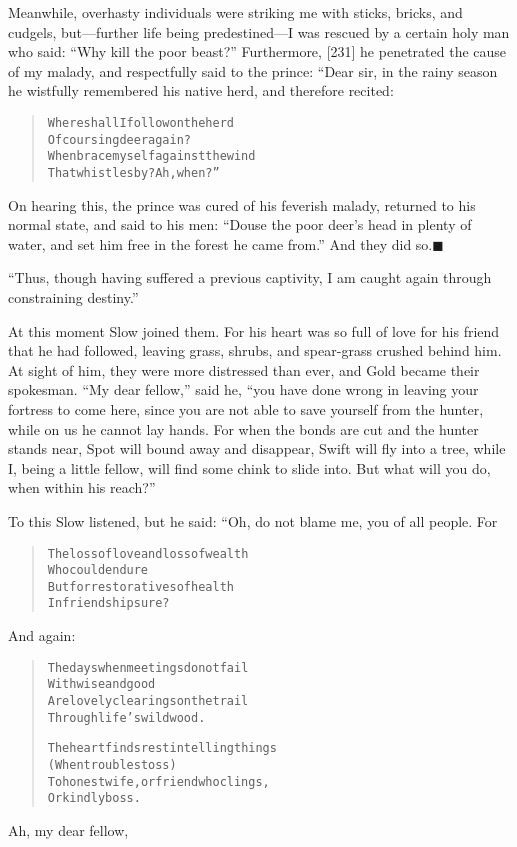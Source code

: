 \documentclass[article, twoside, 14pt]{memoir}
\newcommand{\qed}{\hfill \ensuremath{\blacksquare}}
\renewenvironment{verbatim}{%
\begin{quote}%
\vskip -10pt%
\begin{alltt}\normalfont\large}{\end{alltt}%
\end{quote}%
\vskip -10pt
} %
\begin{document}
Meanwhile, overhasty individuals were striking me with sticks,
bricks, and cudgels, but---further life being predestined---I was
rescued by a certain holy man who said:
``Why kill the poor beast?'' Furthermore, [231] he penetrated the
cause of my malady, and respectfully said to the prince: “Dear sir,
in the rainy season he wistfully remembered his native herd, and
therefore recited:

\begin{verbatim}
Where shall I follow on the herd
    Of coursing deer again?
When brace myself against the wind
    That whistles by? Ah, when?”
\end{verbatim}
On hearing this, the prince was cured of his feverish malady,
returned to his normal state, and said to his men:
``Douse the poor deer's head in plenty of water, and set him free in the forest he came from.''
And they did so.\hyperref[s45]{\qed}

``Thus, though having suffered a previous captivity, I am caught again through constraining destiny.''

At this moment Slow joined them. For his heart was so full of love
for his friend that he had followed, leaving grass, shrubs, and
spear-grass crushed behind him. At sight of him, they were more
distressed than ever, and Gold became their spokesman.
``My dear fellow,'' said he,
``you have done wrong in leaving your fortress to come here, since you are not able to save yourself from the hunter, while on us he cannot lay hands. For when the bonds are cut and the hunter stands near, Spot will bound away and disappear, Swift will fly into a tree, while I, being a little fellow, will find some chink to slide into. But what will you do, when within his reach?''

To this Slow listened, but he said: “Oh, do not blame me, you of
all people. For

\begin{verbatim}
The loss of love and loss of wealth
    Who could endure
But for restoratives of health
    In friendship sure?
\end{verbatim}
And again:

\begin{verbatim}
The days when meetings do not fail
    With wise and good
Are lovely clearings on the trail
    Through life's wild wood.

The heart finds rest in telling things
    (When troubles toss)
To honest wife, or friend who clings,
    Or kindly boss.
\end{verbatim}
Ah, my dear fellow,
\end{document}
